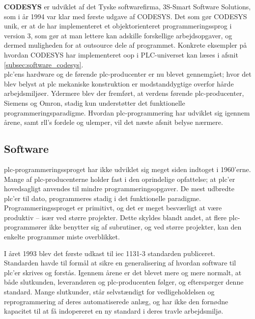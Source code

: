 \noindent\textbf{CODESYS} er udviklet af det Tyske softwarefirma, 3S-Smart Software Solutions, som i år 1994 var klar med første udgave af CODESYS. Det som gør CODESYS unik, er at de har implementeret et objektorienteret programmeringssprog i version 3, som gør at man lettere kan adskille forskellige arbejdsopgaver, og dermed muligheden for at outsource dele af programmet. Konkrete eksempler på hvordan CODESYS har implementeret \gls{oop} i PLC-universet kan læses i afsnit \ref{subsec:software_codesys}. \\

\noindent \gls{plc}'ens hardware og de førende \gls{plc}-producenter er nu blevet gennemgået; hvor det blev belyst at \gls{plc} mekaniske konstruktion er modstanddygtige overfor hårde arbejdsmiljøer. Ydermere blev der fremført, at verdens førende \gls{plc}-producenter, Siemens og Omron, stadig kun understøtter det funktionelle programmeringsparadigme. 
Hvordan \gls{plc}-programmering har udviklet sig igennem årene, samt \gls{rll}'s fordele og ulemper, vil det næste afsnit belyse nærmere.

\subsection{Software}
\gls{plc}-programmeringssproget har ikke udviklet sig meget siden indtoget i 1960’erne. 
Mange af \gls{plc}-producenterne holder fast i den oprindelige opfattelse; at \gls{plc}’er hovedsagligt anvendes til mindre programmeringsopgaver. De mest udbredte \gls{plc}’er til dato, programmeres stadig i det funktionelle paradigme. Programmeringssproget er primitivt, og det er meget besværligt at være produktiv – især ved større projekter. Dette skyldes blandt andet, at flere \gls{plc}-programmører ikke benytter sig af subrutiner, og ved større projekter, kan den enkelte programmør miste overblikket. 

I året 1993 blev det første udkast til \gls{iec} 1131-3 standarden publiceret\cite{iecStandard}. Standarden havde til formål at sikre en generalisering af hvordan software til \gls{plc}'er skrives og forstås. Igennem årene er det blevet mere og mere normalt, at både slutkunden, leverandøren og \gls{plc}-producenten følger, og efterspørger denne standard. Mange slutkunder, står selvstændigt for vedligeholdelsen og reprogrammering af deres automatiserede anlæg, og har ikke den fornødne kapacitet til at få indopereret en ny standard i deres travle arbejdsmiljø. \\

